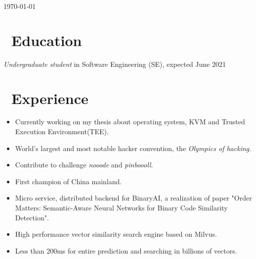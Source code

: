 \documentclass{resume}
\begin{document}
\today



\section{\faGraduationCap\ Education}
\textit{Undergraduate student} in Software Engineering (SE), expected June 2021

\section{\faUsers\ Experience}
\begin{itemize}
    \item Currently working on my thesis about operating system, KVM and Trusted Execution Environment(TEE).
\end{itemize}

\begin{itemize}
    \item World's largest and most notable hacker convention, the \textit{Olympics of hacking}.
    \item Contribute to challenge \textit{nooode} and \textit{pinboooll}.
    \item First champion of China mainland.
\end{itemize}

\begin{itemize}
    \item Micro service, distributed backend for BinaryAI, a realization of paper "Order Matters: Semantic-Aware Neural Networks for Binary Code Similarity Detection".
    \item High performance vector similarity search engine based on Milvus.
    \item Less than 200ms for entire prediction and searching in billions of vectors.
\end{itemize}
\end{document}
